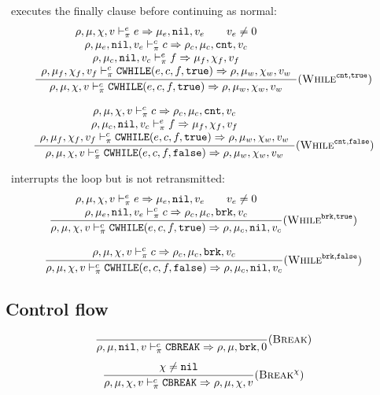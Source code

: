 \cnt\ executes the finally clause before continuing as normal:
\[\dfrac{\begin{array}{c}
    \rho,\mu,\chi,v \vdash_\pi^e e \Rightarrow \mu_e,\texttt{nil},v_e \qquad v_e \ne 0 \\
    \rho,\mu_e,\texttt{nil},v_e \vdash_\pi^c c \Rightarrow \rho_c,\mu_c,\texttt{cnt},v_c \\
    \rho,\mu_c,\texttt{nil},v_c \vdash_\pi^e f \Rightarrow \mu_f,\chi_f,v_f \\
    \rho,\mu_f,\chi_f,v_f \vdash_\pi^c \texttt{CWHILE}(e, c, f, \texttt{true}) \Rightarrow \rho,\mu_w,\chi_w,v_w
\end{array}}{\rho,\mu,\chi,v \vdash_\pi^c \texttt{CWHILE}(e, c, f, \texttt{true}) \Rightarrow \rho,\mu_w,\chi_w,v_w} (\textsc{While}^{\texttt{cnt},\texttt{true}})\]

\[\dfrac{\begin{array}{c}
    \rho,\mu,\chi,v \vdash_\pi^c c \Rightarrow \rho_c,\mu_c,\texttt{cnt},v_c \\
    \rho,\mu_c,\texttt{nil},v_c \vdash_\pi^e f \Rightarrow \mu_f,\chi_f,v_f \\
    \rho,\mu_f,\chi_f,v_f \vdash_\pi^c \texttt{CWHILE}(e, c, f, \texttt{true}) \Rightarrow \rho,\mu_w,\chi_w,v_w
\end{array}}{\rho,\mu,\chi,v \vdash_\pi^c \texttt{CWHILE}(e, c, f, \texttt{false}) \Rightarrow \rho,\mu_w,\chi_w,v_w} (\textsc{While}^{\texttt{cnt},\texttt{false}})\]

\brk\ interrupts the loop but is not retransmitted:
\[\dfrac{\begin{array}{c}
    \rho,\mu,\chi,v \vdash_\pi^e e \Rightarrow \mu_e,\texttt{nil},v_e \qquad v_e \ne 0 \\
    \rho,\mu_e,\texttt{nil},v_e \vdash_\pi^c c \Rightarrow \rho_c,\mu_c,\texttt{brk},v_c \\
\end{array}}{\rho,\mu,\chi,v \vdash_\pi^c \texttt{CWHILE}(e, c, f, \texttt{true}) \Rightarrow \rho,\mu_c,\texttt{nil},v_c} (\textsc{While}^{\texttt{brk},\texttt{true}})\]

\[\dfrac{\begin{array}{c}
    \rho,\mu,\chi,v \vdash_\pi^c c \Rightarrow \rho_c,\mu_c,\texttt{brk},v_c \\
\end{array}}{\rho,\mu,\chi,v \vdash_\pi^c \texttt{CWHILE}(e, c, f, \texttt{false}) \Rightarrow \rho,\mu_c,\texttt{nil},v_c} (\textsc{While}^{\texttt{brk},\texttt{false}})\]

\subsection{Control flow}
\[\dfrac{
}{\rho,\mu,\texttt{nil},v \vdash_\pi^c \texttt{CBREAK} \Rightarrow \rho,\mu,\texttt{brk},0} (\textsc{Break})\]
\[\dfrac{\begin{array}{c}
    \chi\ne\texttt{nil}
\end{array}}{\rho,\mu,\chi,v \vdash_\pi^c \texttt{CBREAK} \Rightarrow \rho,\mu,\chi,v} (\textsc{Break}^\chi)\]

